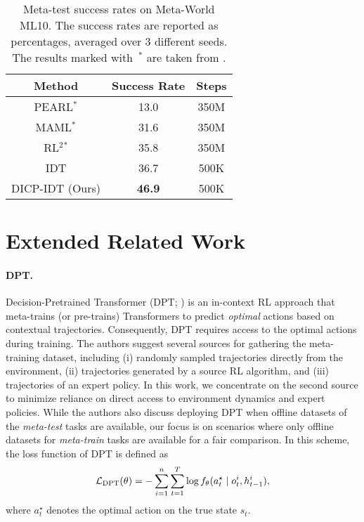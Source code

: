 \documentclass{article}
\begin{document}
\begin{table}[h]
    \caption{Meta-test success rates on Meta-World ML10.
    The success rates are reported as percentages, averaged over 3 different seeds.
    The results marked with~$^*$ are taken from \citet{MW}.
    }
    \label{tab:results_ml10}
    \small \centering
    \begin{tabular}{ccc}
    \toprule
    Method & Success Rate & Steps\\
    \midrule
    PEARL$^*$ & 13.0 & 350M \\
    MAML$^*$ & 31.6 & 350M \\
    RL$^2$$^*$ & 35.8 & 350M \\
    \midrule
    IDT & 36.7 & 500K\\
    \midrule
    DICP-IDT (Ours) & \textbf{46.9} & 500K \\
    \bottomrule
    \end{tabular}
\end{table}

\section{Extended Related Work}
\label{sec:rel_ext}

\paragraph*{DPT.}
Decision-Pretrained Transformer (DPT; \citet{DPT}) is an in-context RL approach that meta-trains (or pre-trains) Transformers to predict \emph{optimal} actions based on contextual trajectories.
Consequently, DPT requires access to the optimal actions during training.
The authors suggest several sources for gathering the meta-training dataset, including (i) randomly sampled trajectories directly from the environment, (ii) trajectories generated by a source RL algorithm, and (iii) trajectories of an expert policy.
In this work, we concentrate on the second source to minimize reliance on direct access to environment dynamics and expert policies.
While the authors also discuss deploying DPT when offline datasets of the \emph{meta-test} tasks are available, our focus is on scenarios where only offline datasets for \emph{meta-train} tasks are available for a fair comparison.
In this scheme, the loss function of DPT is defined as 
\begin{equation}
    {\mathcal{L}}_{\textrm{DPT}}(\theta) = - \sum_{i=1}^n \sum_{t=1}^{T} \log f_\theta(a_t^\star \mid o_t^i, h_{t-1}^i),
    \label{eq:dpt}
  \end{equation}
where $a_t^\star$ denotes the optimal action on the true state $s_t$.
\end{document}
